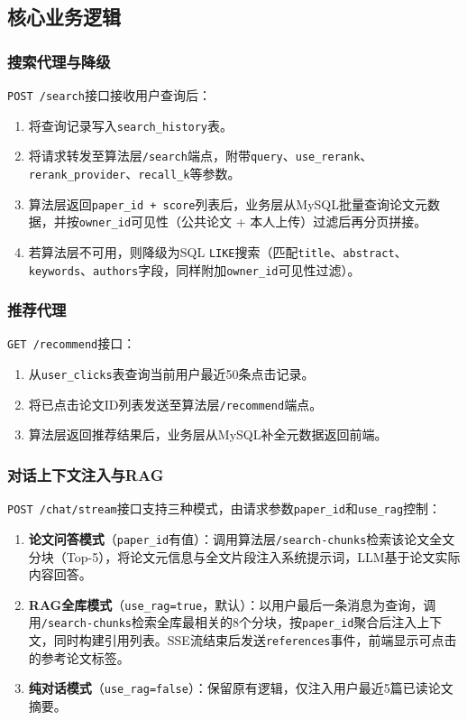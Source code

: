 \documentclass[12pt,a4paper]{ctexart}
\newcommand{\code}[1]{\texttt{#1}}
\newcommand{\api}[1]{\texttt{#1}}
\begin{document}
\subsection{核心业务逻辑}

\subsubsection{搜索代理与降级}

\api{POST /search}接口接收用户查询后：
\begin{enumerate}
\item 将查询记录写入\code{search\_history}表。
\item 将请求转发至算法层\api{/search}端点，附带\code{query}、\code{use\_rerank}、\code{rerank\_provider}、\code{recall\_k}等参数。
\item 算法层返回\code{paper\_id + score}列表后，业务层从MySQL批量查询论文元数据，并按\code{owner\_id}可见性（公共论文 + 本人上传）过滤后再分页拼接。
\item 若算法层不可用，则降级为SQL \code{LIKE}搜索（匹配\code{title}、\code{abstract}、\code{keywords}、\code{authors}字段，同样附加\code{owner\_id}可见性过滤）。
\end{enumerate}

\subsubsection{推荐代理}

\api{GET /recommend}接口：
\begin{enumerate}
\item 从\code{user\_clicks}表查询当前用户最近50条点击记录。
\item 将已点击论文ID列表发送至算法层\api{/recommend}端点。
\item 算法层返回推荐结果后，业务层从MySQL补全元数据返回前端。
\end{enumerate}

\subsubsection{对话上下文注入与RAG}

\api{POST /chat/stream}接口支持三种模式，由请求参数\code{paper\_id}和\code{use\_rag}控制：

\begin{enumerate}
\item \textbf{论文问答模式}（\code{paper\_id}有值）：调用算法层\api{/search-chunks}检索该论文全文分块（Top-5），将论文元信息与全文片段注入系统提示词，LLM基于论文实际内容回答。
\item \textbf{RAG全库模式}（\code{use\_rag=true}，默认）：以用户最后一条消息为查询，调用\api{/search-chunks}检索全库最相关的8个分块，按\code{paper\_id}聚合后注入上下文，同时构建引用列表。SSE流结束后发送\code{references}事件，前端显示可点击的参考论文标签。
\item \textbf{纯对话模式}（\code{use\_rag=false}）：保留原有逻辑，仅注入用户最近5篇已读论文摘要。
\end{enumerate}
\end{document}
